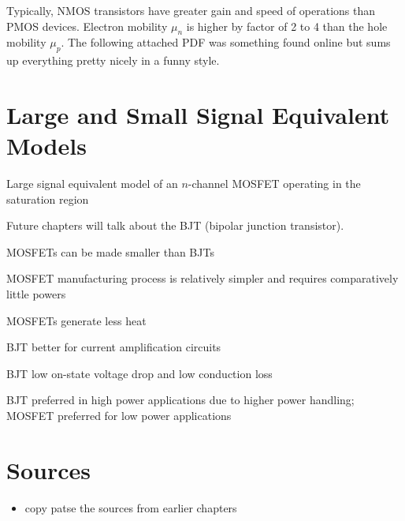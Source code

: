 Typically, NMOS transistors have greater gain and speed of operations than PMOS devices. Electron mobility $\mu_n$ is higher by factor of 2 to 4 than the hole mobility $\mu_p$. The following attached PDF was something found online but sums up everything pretty nicely in a funny style.

\newpage %
% 


\section{Large and Small Signal Equivalent Models}
Large signal equivalent model of an $n$-channel MOSFET operating in the saturation region


Future chapters will talk about the BJT (bipolar junction transistor). 
\begin{pline}
    \item MOSFETs can be made smaller than BJTs
    \item MOSFET manufacturing process is relatively simpler and requires comparatively little powers
    \item MOSFETs generate less heat
    \item BJT better for current amplification circuits
    \item BJT low on-state voltage drop and low conduction loss
    \item BJT preferred in high power applications due to higher power handling; MOSFET preferred for low power applications
\end{pline}


\section{Sources}
\begin{itemize}
    \item copy patse the sources from earlier chapters
\end{itemize}